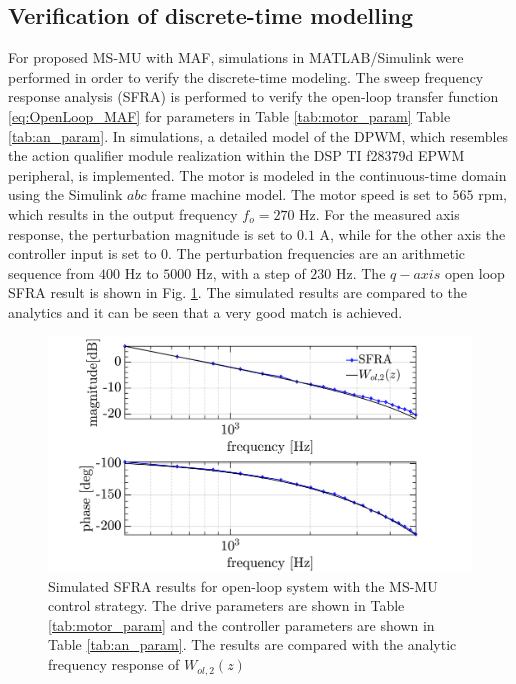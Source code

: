 \documentclass[conference]{IEEEtran}
\begin{document}
\subsection{Verification of discrete-time modelling}
For proposed MS-MU with MAF, simulations in MATLAB/Simulink were performed in order to verify the discrete-time modeling. 
The sweep frequency response analysis (SFRA) is performed to verify the open-loop transfer function \eqref{eq:OpenLoop_MAF} for parameters in Table \ref{tab:motor_param} Table \ref{tab:an_param}. In simulations, a detailed model of the DPWM, which resembles the action qualifier module realization within the DSP TI f28379d EPWM peripheral, is implemented. The motor is modeled in the continuous-time domain using the Simulink $abc$ frame machine model. The motor speed is set to $565$ rpm, which results in the output frequency $f_o = 270$ Hz.
For the measured axis response, the perturbation magnitude is set to $0.1$ A, while for the other axis the controller input is set to $0$. The perturbation frequencies are an arithmetic sequence from $400$ Hz to $5000$ Hz, with a step of $230$ Hz. The $q-axis$ open loop SFRA result is shown in Fig. \ref{fig:MSMUmaf_olfra}. The simulated results are compared to the analytics and it can be seen that a very good match is achieved.

\begin{figure}[t!]
    \centerline{\includegraphics[width=1\linewidth]{figures/ivan figs/MSMU_OL_SFRA.png}}
    \caption{Simulated SFRA results for open-loop system with the MS-MU control strategy. The drive parameters are shown in Table \ref{tab:motor_param} and the controller parameters are shown in Table \ref{tab:an_param}. The results are compared with the analytic frequency response of $W_{ol,2}(z)$ }
    \label{fig:MSMUmaf_olfra} 
\end{figure}
\end{document}
